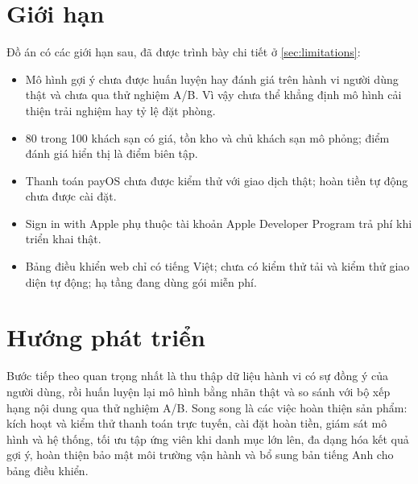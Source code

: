 \section*{Giới hạn}

Đồ án có các giới hạn sau, đã được trình bày chi tiết ở \cref{sec:limitations}:
\begin{itemize}
\item Mô hình gợi ý chưa được huấn luyện hay đánh giá trên hành vi người dùng thật và chưa qua thử nghiệm A/B. Vì vậy chưa thể khẳng định mô hình cải thiện trải nghiệm hay tỷ lệ đặt phòng.
\item 80 trong 100 khách sạn có giá, tồn kho và chủ khách sạn mô phỏng; điểm đánh giá hiển thị là điểm biên tập.
\item Thanh toán payOS chưa được kiểm thử với giao dịch thật; hoàn tiền tự động chưa được cài đặt.
\item Sign in with Apple phụ thuộc tài khoản Apple Developer Program trả phí khi triển khai thật.
\item Bảng điều khiển web chỉ có tiếng Việt; chưa có kiểm thử tải và kiểm thử giao diện tự động; hạ tầng đang dùng gói miễn phí.
\end{itemize}

\section*{Hướng phát triển}

Bước tiếp theo quan trọng nhất là thu thập dữ liệu hành vi có sự đồng ý của người dùng, rồi huấn luyện lại mô hình bằng nhãn thật và so sánh với bộ xếp hạng nội dung qua thử nghiệm A/B. Song song là các việc hoàn thiện sản phẩm: kích hoạt và kiểm thử thanh toán trực tuyến, cài đặt hoàn tiền, giám sát mô hình và hệ thống, tối ưu tập ứng viên khi danh mục lớn lên, đa dạng hóa kết quả gợi ý, hoàn thiện bảo mật môi trường vận hành và bổ sung bản tiếng Anh cho bảng điều khiển.
